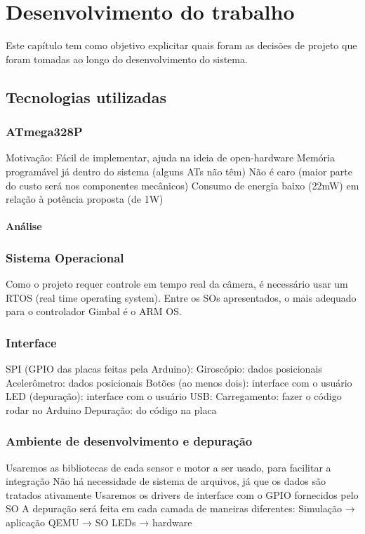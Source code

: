 \chapter{Desenvolvimento do trabalho}

Este capítulo tem como objetivo explicitar quais foram as decisões de projeto que foram tomadas ao longo do desenvolvimento do sistema.

\section{Tecnologias utilizadas}


\subsection{ATmega328P}
Motivação:
Fácil de implementar, ajuda na ideia de open-hardware
Memória programável já dentro do sistema (alguns ATs não têm)
Não é caro (maior parte do custo será nos componentes mecânicos)
Consumo de energia baixo (22mW) em relação à potência proposta (de 1W)

\subsubsection{Análise}


\subsection{Sistema Operacional}
Como o projeto requer controle em tempo real da câmera, é necessário usar um RTOS (real time operating system).
Entre os SOs apresentados, o mais adequado para o controlador Gimbal é o ARM OS.

\subsection{Interface}
SPI (GPIO das placas feitas pela Arduino):
Giroscópio: dados posicionais
Acelerômetro: dados posicionais
Botões (ao menos dois): interface com o usuário
LED (depuração): interface com o usuário
USB:
Carregamento: fazer o código rodar no Arduino 
Depuração: do código na placa

\subsection{Ambiente de desenvolvimento e depuração}
Usaremos as bibliotecas de cada sensor e motor a ser usado, para facilitar a integração
Não há necessidade de sistema de arquivos, já que os dados são tratados ativamente
Usaremos os drivers de interface com o GPIO fornecidos pelo SO
A depuração será feita em cada camada de maneiras diferentes: 
Simulação → aplicação 
QEMU → SO 
LEDs → hardware 

